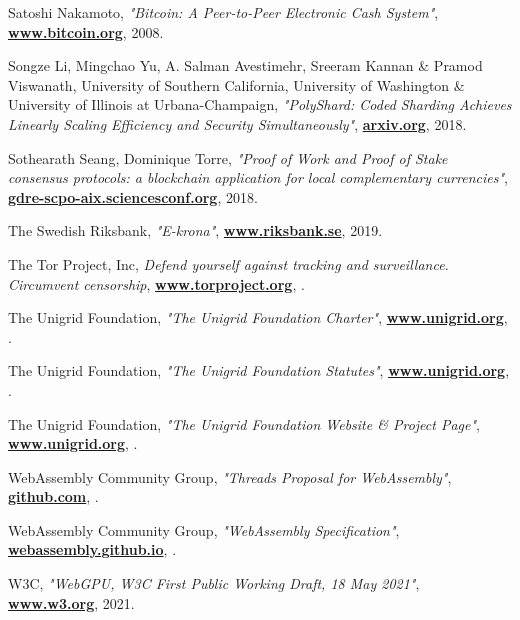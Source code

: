 \documentclass[10pt,a4paper,final]{article}
\let\oldhref\href
\renewcommand{\href}[2]{\oldhref{#1}{\bfseries#2}}
\begin{document}
\begin{thebibliography}{999}
	Satoshi Nakamoto,
	\emph{"Bitcoin: A Peer-to-Peer Electronic Cash System"},
	\href{http://www.bitcoin.org}{www.bitcoin.org},
	2008.

	Songze Li, Mingchao Yu, A. Salman Avestimehr, Sreeram Kannan \& Pramod Viswanath, University of Southern California, University of Washington \& University of Illinois at Urbana-Champaign,
	\emph{"PolyShard: Coded Sharding Achieves Linearly Scaling Efficiency and Security Simultaneously"},
	\href{https://arxiv.org/pdf/1809.10361.pdf}{arxiv.org},
	2018.

	Sothearath Seang, Dominique Torre,
	\emph{"Proof of Work and Proof of Stake consensus protocols: a blockchain application for local complementary currencies"},
	\href{https://gdre-scpo-aix.sciencesconf.org/195470/document}{gdre-scpo-aix.sciencesconf.org},
	2018.

	The Swedish Riksbank,
	\emph{"E-krona"},
	\href{https://www.riksbank.se/en-gb/payments--cash/e-krona}{www.riksbank.se},
	2019.

	The Tor Project, Inc,
	\emph{Defend yourself against tracking and surveillance. Circumvent censorship},
	\href{https://www.torproject.org}{www.torproject.org},
	\the\year{}.

	The Unigrid Foundation,
	\emph{"The Unigrid Foundation Charter"},
	\href{https://www.unigrid.org/link-not-yet-available}{www.unigrid.org},
	\the\year{}.

	The Unigrid Foundation,
	\emph{"The Unigrid Foundation Statutes"},
	\href{https://www.unigrid.org/link-not-yet-available}{www.unigrid.org},
	\the\year{}.

	The Unigrid Foundation,
	\emph{"The Unigrid Foundation Website \& Project Page"},
	\href{https://www.unigrid.org}{www.unigrid.org},
	\the\year{}.

	WebAssembly Community Group,
	\emph{"Threads Proposal for WebAssembly"},
	\href{https://github.com/WebAssembly/threads}{github.com},
	\the\year{}.

	WebAssembly Community Group,
	\emph{"WebAssembly Specification"},
	\href{https://webassembly.github.io/spec/core/_download/WebAssembly.pdf}{webassembly.github.io},
	\the\year{}.

	W3C,
	\emph{"WebGPU, W3C First Public Working Draft, 18 May 2021"},
	\href{https://www.w3.org/TR/2021/WD-webgpu-20210518/}{www.w3.org},
	2021.


\end{thebibliography}
\end{document}
